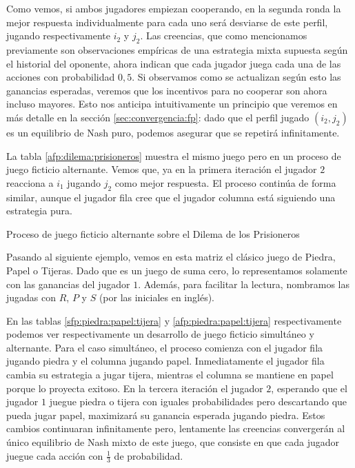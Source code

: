 Como vemos, si ambos jugadores empiezan cooperando, en la segunda ronda la mejor respuesta individualmente para cada uno será desviarse de este perfil, jugando respectivamente $i_2$ y $j_2$. Las creencias, que como mencionamos previamente son observaciones empíricas de una estrategia mixta supuesta según el historial del oponente, ahora indican que cada jugador juega cada una de las acciones con probabilidad $0,5$. Si observamos como se actualizan según esto las ganancias esperadas, veremos que los incentivos para no cooperar son ahora incluso mayores. Esto nos anticipa intuitivamente un principio que veremos en más detalle en la sección \ref{sec:convergencia:fp}: dado que el perfil jugado $(i_2, j_2)$ es un equilibrio de Nash puro, podemos asegurar que se repetirá infinitamente.

La tabla \ref{afp:dilema:prisioneros} muestra el mismo juego pero en un proceso de juego ficticio alternante. Vemos que, ya en la primera iteración el jugador $2$ reacciona a $i_1$ jugando $j_2$ como mejor respuesta. El proceso continúa de forma similar, aunque el jugador fila cree que el jugador columna está siguiendo una estrategia pura.

\begin{table} %
    \centering
    
    \caption{Proceso de juego ficticio alternante sobre el Dilema de los Prisioneros}
    \label{afp:dilema:prisioneros}
\end{table}

Pasando al siguiente ejemplo, vemos en esta matriz el clásico juego de Piedra, Papel o Tijeras. Dado que es un juego de suma cero, lo representamos solamente con las ganancias del jugador $1$. Además, para facilitar la lectura, nombramos las jugadas con $R$, $P$ y $S$ (por las iniciales en inglés).



En las tablas \ref{sfp:piedra:papel:tijera} y \ref{afp:piedra:papel:tijera} respectivamente podemos ver respectivamente un desarrollo de juego ficticio simultáneo y alternante. Para el caso simultáneo, el proceso comienza con el jugador fila jugando piedra y el columna jugando papel. Inmediatamente el jugador fila cambia su estrategia a jugar tijera, mientras el columna se mantiene en papel porque lo proyecta exitoso. En la tercera iteración el jugador $2$, esperando que el jugador $1$ juegue piedra o tijera con iguales probabilidades pero descartando que pueda jugar papel, maximizará su ganancia esperada jugando piedra. Estos cambios continuaran infinitamente pero, lentamente las creencias convergerán al único equilibrio de Nash mixto de este juego, que consiste en que cada jugador juegue cada acción con $\frac{1}{3}$ de probabilidad.

